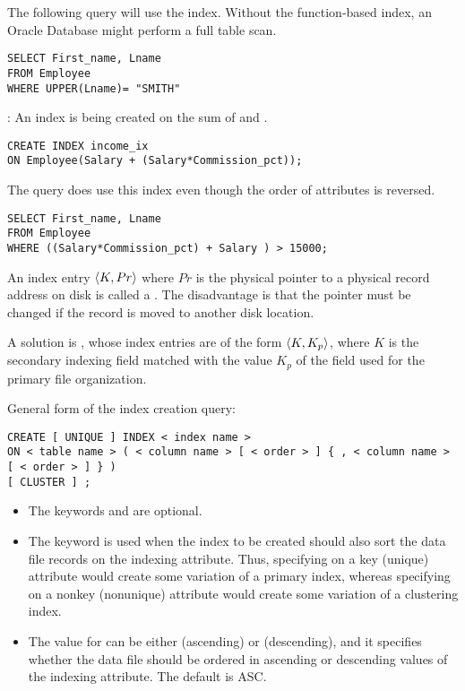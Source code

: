     \par The following query will use the index. Without the function-based index, an Oracle Database might perform a full table scan.

\begin{verbatim}
SELECT First_name, Lname
FROM Employee
WHERE UPPER(Lname)= "SMITH"
\end{verbatim}

    \par {}: An index is being created on the sum of  and .
\begin{verbatim}
CREATE INDEX income_ix
ON Employee(Salary + (Salary*Commission_pct));
\end{verbatim}

The query does use this index even though the order of attributes is reversed.

\begin{verbatim}
SELECT First_name, Lname
FROM Employee
WHERE ((Salary*Commission_pct) + Salary ) > 15000;
\end{verbatim}


    \par An index entry $\langle K, Pr \rangle$ where $Pr$ is the physical pointer to a physical record address on disk is called a . The disadvantage is that the pointer must be changed if the record is moved to
    another disk location.
    \par A solution is , whose index entries are of the form $\langle K, K_p \rangle$, where $K$ is the secondary indexing field matched with the value $K_p$ of the field used for the primary file organization.
  
    \par General form of the index creation query:
\begin{verbatim}
CREATE [ UNIQUE ] INDEX < index name >
ON < table name > ( < column name > [ < order > ] { , < column name > [ < order > ] } )
[ CLUSTER ] ;
\end{verbatim}
    \begin{itemize}
      \item The keywords  and  are optional.
      \item The keyword  is used when the index to be created should also sort the data file records on the indexing attribute. Thus, specifying  on a key (unique) attribute would create some variation of a primary index, whereas specifying  on a nonkey (nonunique) attribute would create some variation of a clustering index.
      \item The value for  can be either  (ascending) or  (descending), and it specifies whether the data file should be ordered in ascending or descending values of the indexing attribute. The default is ASC.
    \end{itemize}

